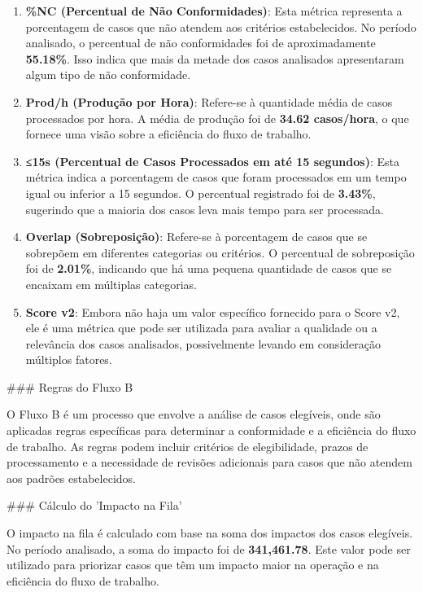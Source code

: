 \documentclass[11pt]{article}
\begin{document}
\begin{enumerate}
\item \textbf{\textbf{\%NC (Percentual de Não Conformidades)}}: Esta métrica representa a porcentagem de casos que não atendem aos critérios estabelecidos. No período analisado, o percentual de não conformidades foi de aproximadamente \textbf{\textbf{55.18\%}}. Isso indica que mais da metade dos casos analisados apresentaram algum tipo de não conformidade.

\item \textbf{\textbf{Prod/h (Produção por Hora)}}: Refere-se à quantidade média de casos processados por hora. A média de produção foi de \textbf{\textbf{34.62 casos/hora}}, o que fornece uma visão sobre a eficiência do fluxo de trabalho.

\item \textbf{\textbf{≤15s (Percentual de Casos Processados em até 15 segundos)}}: Esta métrica indica a porcentagem de casos que foram processados em um tempo igual ou inferior a 15 segundos. O percentual registrado foi de \textbf{\textbf{3.43\%}}, sugerindo que a maioria dos casos leva mais tempo para ser processada.

\item \textbf{\textbf{Overlap (Sobreposição)}}: Refere-se à porcentagem de casos que se sobrepõem em diferentes categorias ou critérios. O percentual de sobreposição foi de \textbf{\textbf{2.01\%}}, indicando que há uma pequena quantidade de casos que se encaixam em múltiplas categorias.

\item \textbf{\textbf{Score v2}}: Embora não haja um valor específico fornecido para o Score v2, ele é uma métrica que pode ser utilizada para avaliar a qualidade ou a relevância dos casos analisados, possivelmente levando em consideração múltiplos fatores.
\end{enumerate}

\#\#\# Regras do Fluxo B

O Fluxo B é um processo que envolve a análise de casos elegíveis, onde são aplicadas regras específicas para determinar a conformidade e a eficiência do fluxo de trabalho. As regras podem incluir critérios de elegibilidade, prazos de processamento e a necessidade de revisões adicionais para casos que não atendem aos padrões estabelecidos.

\#\#\# Cálculo do 'Impacto na Fila'

O impacto na fila é calculado com base na soma dos impactos dos casos elegíveis. No período analisado, a soma do impacto foi de \textbf{\textbf{341,461.78}}. Este valor pode ser utilizado para priorizar casos que têm um impacto maior na operação e na eficiência do fluxo de trabalho.
\end{document}
